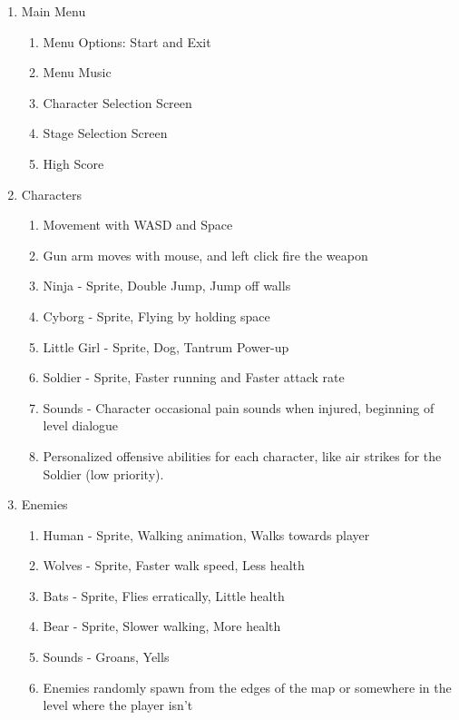 \documentclass{article}
\begin{document}
\begin{enumerate}
     \item Main Menu
        \begin{enumerate}
            \item Menu Options: Start and Exit
            \item Menu Music
            \item Character Selection Screen
            \item Stage Selection Screen
            \item High Score
        \end{enumerate}
    \item Characters
        \begin{enumerate}
            \item Movement with WASD and Space
            \item Gun arm moves with mouse, and left click fire the weapon
            \item Ninja - Sprite, Double Jump, Jump off walls
            \item Cyborg - Sprite, Flying by holding space
            \item Little Girl - Sprite, Dog, Tantrum Power-up
            \item Soldier - Sprite, Faster running and Faster attack rate
            \item Sounds - Character occasional pain sounds when injured, beginning of level dialogue
            \item Personalized offensive abilities for each character, like air strikes for the Soldier (low priority).
        \end{enumerate}
    \item Enemies
        \begin{enumerate}
            \item Human - Sprite, Walking animation, Walks towards player
            \item Wolves - Sprite, Faster walk speed, Less health
            \item Bats - Sprite, Flies erratically, Little health
            \item Bear - Sprite, Slower walking, More health
            \item Sounds - Groans, Yells
            \item Enemies randomly spawn from the edges of the map or somewhere in the level where the player isn't
        \end{enumerate}

\end{enumerate}
\end{document}
